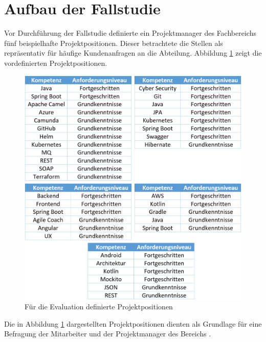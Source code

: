 \begin{minipage}{\linewidth}

\end{minipage}

\section{Aufbau der Fallstudie}
\label{ch:methodik:evaluation}
Vor Durchführung der Fallstudie definierte ein Projektmanager des Fachbereichs \JES fünf beispielhafte Projektpositionen. Dieser betrachtete die Stellen als repräsentativ für häufige Kundenanfragen an die Abteilung. Abbildung \ref{fig:methodik:evaluation:abb2} zeigt die vordefinierten Projektpositionen.

\begin{figure}[h]
	\centering
	\includegraphics[width=1.0\textwidth]{gfx/Projekt.png}
	\caption{Für die Evaluation definierte Projektpositionen}
	\label{fig:methodik:evaluation:abb2}
\end{figure}

Die in Abbildung \ref{fig:methodik:evaluation:abb2} dargestellten Projektpositionen dienten als Grundlage für eine Befragung der Mitarbeiter und der Projektmanager des Bereichs \JES.


